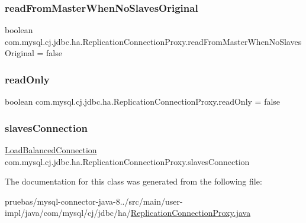 \subsubsection{\texorpdfstring{read\+From\+Master\+When\+No\+Slaves\+Original}{readFromMasterWhenNoSlavesOriginal}}
{\footnotesize\ttfamily boolean com.\+mysql.\+cj.\+jdbc.\+ha.\+Replication\+Connection\+Proxy.\+read\+From\+Master\+When\+No\+Slaves\+Original = false\hspace{0.3cm}{\ttfamily [protected]}}

\mbox{\label{classcom_1_1mysql_1_1cj_1_1jdbc_1_1ha_1_1_replication_connection_proxy_aed908cc85582ecb990209d20ff83e2b0}} 
\subsubsection{\texorpdfstring{read\+Only}{readOnly}}
{\footnotesize\ttfamily boolean com.\+mysql.\+cj.\+jdbc.\+ha.\+Replication\+Connection\+Proxy.\+read\+Only = false\hspace{0.3cm}{\ttfamily [protected]}}

\mbox{\label{classcom_1_1mysql_1_1cj_1_1jdbc_1_1ha_1_1_replication_connection_proxy_a088499dd8e50f1f2eec38a635765300a}} 
\subsubsection{\texorpdfstring{slaves\+Connection}{slavesConnection}}
{\footnotesize\ttfamily \mbox{\hyperlink{interfacecom_1_1mysql_1_1cj_1_1jdbc_1_1ha_1_1_load_balanced_connection}{Load\+Balanced\+Connection}} com.\+mysql.\+cj.\+jdbc.\+ha.\+Replication\+Connection\+Proxy.\+slaves\+Connection\hspace{0.3cm}{\ttfamily [protected]}}



The documentation for this class was generated from the following file\+:\begin{DoxyCompactItemize}
\item 
pruebas/mysql-\/connector-\/java-\/8../src/main/user-\/impl/java/com/mysql/cj/jdbc/ha/\mbox{\hyperlink{_replication_connection_proxy_8java}{Replication\+Connection\+Proxy.\+java}}\end{DoxyCompactItemize}
